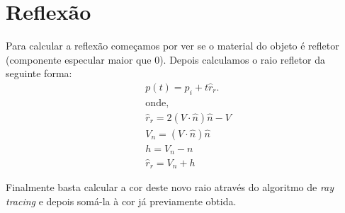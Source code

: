 \documentclass{article}
\begin{document}
    \section*{Reflexão}
        \par
        Para calcular a reflexão começamos por ver se o material do objeto é refletor (componente especular maior que 0). Depois calculamos o raio refletor da seguinte forma:
        \begin{equation*}
            \begin{split}
                &p(t) = p_i + t\hat{r}_r.\\
                &\textrm{onde,}\\
                &\hat{r}_r = 2(V \cdot \hat{n})\hat{n} - V \\
                &V_n = (V \cdot \hat{n})\hat{n}\\
                &h = V_n - n \\
                &\hat{r}_r = V_n + h
            \end{split}
        \end{equation*}
        \par
        Finalmente basta calcular a cor deste novo raio através do algoritmo de \textit{ray tracing} e depois somá-la à cor já previamente obtida.
\end{document}

